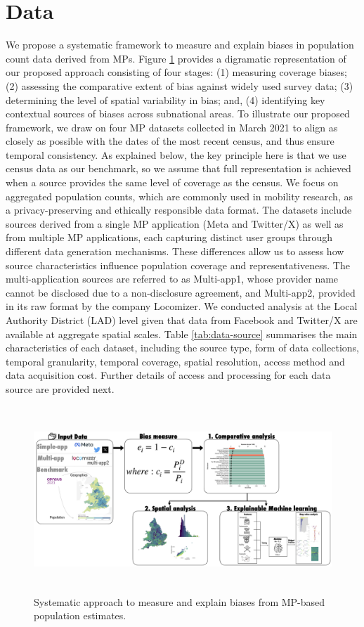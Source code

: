 \documentclass{article}
\begin{document}
\section{Data}\label{sec-data}

We propose a systematic framework to measure and explain biases in
population count data derived from MPs. Figure
\ref{fig:debias-approach} provides a digramatic representation of our
proposed approach consisting of four stages: (1) measuring coverage
biases; (2) assessing the comparative extent of bias against widely used
survey data; (3) determining the level of spatial variability in bias;
and, (4) identifying key contextual sources of biases across subnational
areas. To illustrate our proposed framework, we draw on four MP datasets
collected in March 2021 to align as closely as possible with the dates
of the most recent census, and thus ensure temporal consistency. As
explained below, the key principle here is that we use census data as
our benchmark, so we assume that full representation is achieved when a
source provides the same level of coverage as the census. We focus on
aggregated population counts, which are commonly used in mobility
research, as a privacy-preserving and ethically responsible data format.
The datasets include sources derived from a single MP application (Meta
and Twitter/X) as well as from multiple MP applications, each capturing
distinct user groups through different data generation mechanisms. These
differences allow us to assess how source characteristics influence
population coverage and representativeness. The multi-application
sources are referred to as Multi-app1, whose provider name cannot be
disclosed due to a non-disclosure agreement, and Multi-app2, provided in
its raw format by the company Locomizer. We conducted analysis at the
Local Authority District (LAD) level given that data from Facebook and
Twitter/X are available at aggregate spatial scales. Table
\ref{tab:data-source} summarises the main characteristics of each
dataset, including the source type, form of data collections, temporal
granularity, temporal coverage, spatial resolution, access method and
data acquisition cost. Further details of access and processing for each
data source are provided next.

\begin{figure}
\centering
\includegraphics[width=15cm,height=7cm]{figures/debias-approach.png}
\caption{Systematic approach to measure and explain biases from MP-based
population estimates.}\label{fig:debias-approach}
\end{figure}
\end{document}
